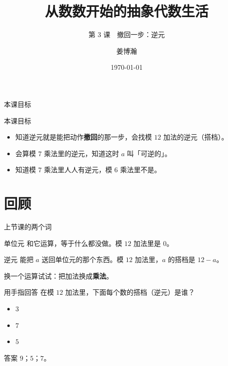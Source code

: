 \documentclass[10pt]{beamer}
\title{从数数开始的抽象代数生活}
\subtitle{第 3 课　撤回一步：逆元}
\author{姜博瀚}
\institute{厦门大学附属实验中学}
\date{\today}
\begin{document}
\begin{frame}
  \titlepage
\end{frame}

\begin{frame}{本课目标}
  \begin{block}{本课目标}
    \begin{itemize}
      \item 知道逆元就是能把动作\textbf{撤回}的那一步，会找模 \(12\) 加法的逆元（搭档）。
      \item 会算模 \(7\) 乘法里的逆元，知道这时 \(a\) 叫「可逆的」。
      \item 知道模 \(7\) 乘法里人人有逆元，模 \(6\) 乘法里不是。
    \end{itemize}
  \end{block}
\end{frame}

\section{回顾}

\begin{frame}{上节课的两个词}
  \begin{block}{单位元}
    和它运算，等于什么都没做。模 \(12\) 加法里是 \textbf{\(0\)}。
  \end{block}
  \pause
  \begin{block}{逆元}
    能把 \(a\) 送回单位元的那个东西。模 \(12\) 加法里，\(a\) 的搭档是 \(12-a\)。
  \end{block}
  \pause
  \begin{center}
    {\large 换一个运算试试：把加法换成\textbf{乘法}。}
  \end{center}
\end{frame}

\begin{frame}{用手指回答}
  在模 \(12\) 加法里，下面每个数的搭档（逆元）是谁？
  \begin{itemize}
    \item \(3\)
    \item \(7\)
    \item \(5\)
  \end{itemize}
  \pause
  \begin{block}{答案}
    \(9\)；\quad \(5\)；\quad \(7\)。
  \end{block}
\end{frame}
\end{document}
